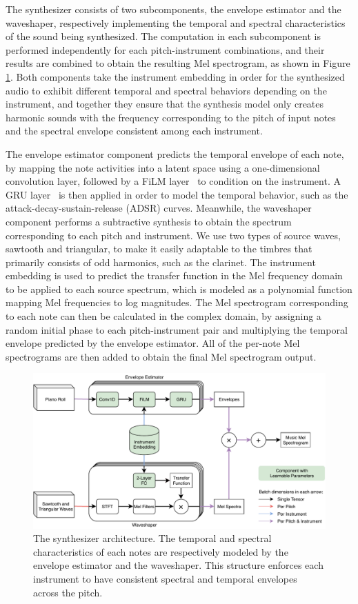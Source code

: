 The synthesizer consists of two subcomponents, the envelope estimator and the waveshaper, respectively implementing the temporal and spectral characteristics of the sound being synthesized.
The computation in each subcomponent is performed independently for each pitch-instrument combinations, and their results are combined to obtain the resulting Mel spectrogram, as shown in Figure \ref{fig:synthesizer-architecture}.
Both components take the instrument embedding in order for the synthesized audio to exhibit different temporal and spectral behaviors depending on the instrument, and together they ensure that the synthesis model only creates harmonic sounds with the frequency corresponding to the pitch of input notes and the spectral envelope consistent among each instrument.

The envelope estimator component predicts the temporal envelope of each note, by mapping the note activities into a latent space using a one-dimensional convolution layer, followed by a FiLM layer~\cite{perez2018film} to condition on the instrument.
A GRU layer~\cite{cho2014seq2seq} is then applied in order to model the temporal behavior, such as the attack-decay-sustain-release (ADSR) curves.
Meanwhile, the waveshaper component performs a subtractive synthesis to obtain the spectrum corresponding to each pitch and instrument.
We use two types of source waves, sawtooth and triangular, to make it easily adaptable to the timbres that primarily consists of odd harmonics, such as the clarinet.
The instrument embedding is used to predict the transfer function in the Mel frequency domain to be applied to each source spectrum, which is modeled as a polynomial function mapping Mel frequencies to log magnitudes.
The Mel spectrogram corresponding to each note can then be calculated in the complex domain, by assigning a random initial phase to each pitch-instrument pair and multiplying the temporal envelope predicted by the envelope estimator.
All of the per-note Mel spectrograms are then added to obtain the final Mel spectrogram output.



\begin{figure}
	\centering
	\includegraphics[width=\textwidth]{synthesizer-architecture.pdf}
	\caption{The synthesizer architecture. The temporal and spectral characteristics of each notes are respectively modeled by the envelope estimator and the waveshaper. This structure enforces each instrument to have consistent spectral and temporal envelopes across the pitch.}\label{fig:synthesizer-architecture}
\end{figure}


